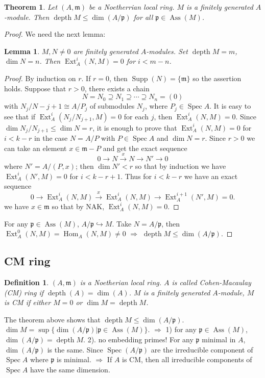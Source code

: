 \documentclass[cs4size]{article}
\newcommand{\frm}{\mathfrak{m}}
\newcommand{\frp}{\mathfrak{p}}
\newcommand{\ra}{\rightarrow}
\newcommand{\xr}{\xrightarrow}
\newcommand{\Ra}{\Rightarrow}
\DeclareMathOperator{\Ext}{Ext}
\DeclareMathOperator{\Hom}{Hom}
\DeclareMathOperator{\Spec}{Spec}
\DeclareMathOperator{\Supp}{Supp}
\DeclareMathOperator{\Ass}{Ass}
\DeclareMathOperator{\depth}{depth}
\newtheorem{thm}{Theorem}
\newtheorem{definition}{Definition}
\newtheorem{lem}{Lemma}
\begin{document}
\begin{thm}
Let $(A,\frm)$ be a Noetherrian local ring. $M$ is a finitely generated $A$-module. Then $\depth M\leq \dim (A/\frp)$ for all $\frp\in\Ass(M)$.
\end{thm}
\begin{proof}
We need the next lemma:
\begin{lem}
$M,N\neq 0$ are finitely generated $A$-modules. Set $\depth M=m$, $\dim N=n$. Then $\Ext_A^i(N,M)=0$ for $i<m-n$.
\end{lem}
\begin{proof}
By induction on $r$. If $r=0$, then $\Supp(N)=\{\frm\}$ so the assertion holds. Suppose that $r>0$, there exists a chain
\[N=N_0\supseteq N_1\supseteq\cdots\supseteq N_n=(0)\] with $N_j/N-{j+1}\cong A/P_j$ of submodules $N_j$, where $P_j\in \Spec A$. It is easy to see that if $\Ext_A^i(N_j/N_{j+1},M)=0$ for each $j$, then $\Ext_A^i(N,M)=0$. Since $\dim N_j/N_{j+1}\leq \dim N=r$, it is enough to prove that $\Ext_A^i(N,M)=0$ for $i<k-r$ in the case $N=A/P$ with $P\in \Spec A$ and $\dim N=r$. Since $r>0$ we can take an element $x\in \frm- P$ and get the exact sequence
\[0\ra N\xr{x}N\ra N'\ra 0\]
where $N'=A/(P,x)$; then $\dim N'<r$ so that by induction we have $\Ext_A^i(N',M)=0$ for $i<k-r+1$. Thus for $i<k-r$ we have an exact sequence
\[0\ra \Ext_A^i(N,M)\xr{x}\Ext_A^i(N,M)\ra \Ext_A^{i+1}(N',M)=0.\]
we have $x\in\frm$ so that by NAK, $\Ext_A^i(N,M)=0$.
\end{proof}
For any $\frp\in \Ass(M)$, $A/\frp\hookrightarrow M$. Take $N=A/\frp$, then $\Ext_A^0(N,M)=\Hom_A(N,M)\neq 0$ $\Ra$ $\depth M\leq \dim (A/\frp)$.
\end{proof}


\subsection{CM ring}
\begin{definition}
$(A,\frm)$ is a Noetherian local ring. $A$ is called Cohen-Macaulay (CM) ring if $\depth (A)=\dim (A)$. $M$ is a finitely generated $A$-module, $M$ is CM if either $M=0$ or $\dim M=\depth M$.
\end{definition}

The theorem above shows that $\depth M\leq\dim (A/\frp)$. $\dim M=\sup \{\dim (A/\frp)| \frp\in\Ass(M)\}$. $\Ra$ 1) for any $\frp\in\Ass(M)$, $\dim (A/\frp)=\depth M$. 2). no embedding primes! For any $\frp$ minimal in $A$, $\dim (A/\frp)$ is the same. Since $\Spec (A/\frp)$ are the irreducible component of $\Spec A$ where $\frp$ is minimal. $\Ra$ If $A$ is CM, then all irreducible components of $\Spec A $ have the same dimension.
\end{document}
